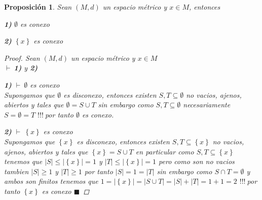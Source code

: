 \documentclass[oneside]{book} %
\theoremstyle{Teorema}
\newtheorem{Proposicion}[Definicion]{Proposición}
\theoremstyle{Ejemplos}
\theoremstyle{[Obs]}
\newcommand{\card}[1]{\left|#1\right|} %
\renewcommand{\{}{\left\lbrace} %
\renewcommand{\}}{\right\rbrace} %
\renewcommand{\u}{\cup} %
\newcommand{\n}{\cap} %
\renewcommand{\sc}{\subseteq} %
\renewcommand{\qed}{$\blacksquare$} %
\newcommand{\pd}{$\vdash\ $} %
\renewcommand{\c}{$!!!\ $} %
\begin{document}
			\begin{Proposicion}\setlength{\parindent}{0em}
			
				Sean $(M, d)$ un espacio métrico y $x \in M$, entonces 

				\textbf{1)} $\emptyset$ es conexo 

				\textbf{2)} $\{ x \}$ es conexo

				\begin{proof}
					
					Sean $(M, d)$ un espacio métrico y $x \in M$ \\ 
					\pd \textbf{1)} y \textbf{2)} 

					\textbf{1)} \pd $\emptyset$ es conexo \\ 
					Supongamos que $\emptyset$ es disconexo, entonces existen $S, T \sc \emptyset$ no vacios, ajenos, abiertos y tales que $\emptyset = S \u T$ sin embargo como $S, T \sc \emptyset$ necesariamente $S = \emptyset = T$ \c por tanto $\emptyset$ es conexo.

					\textbf{2)} \pd $\{ x \}$ es conexo \\ 
					Supongamos que $\{ x \}$ es disconexo, entonces existen $S, T \sc \{ x \}$ no vacios, ajenos, abiertos y tales que $\{ x \} = S \u T$ en particular como $S, T \sc \{ x \}$ tenemos que $\card{S} \leq \card{\{ x \}} = 1$ y $\card{T} \leq \card{\{ x \}} = 1$ pero como son no vacios tambien $\card{S} \geq 1$ y $\card{T} \geq 1$ por tanto $\card{S} = 1 = \card{T}$ sin embargo como $S \n T = \emptyset$ y ambos son finitos tenemos que $1 = \card{\{ x \}} = \card{S \u T} = \card{S} + \card{T} = 1 + 1 = 2$ \c por tanto $\{ x \}$ es conexo \qed

				\end{proof}
			
			\end{Proposicion}
\end{document}
